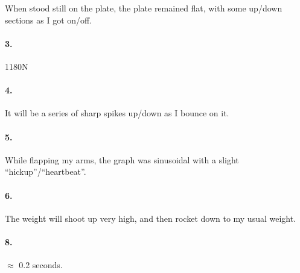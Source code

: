         \begin{mdframed}
            When stood still on the plate, the plate remained flat, with some up/down sections as I got on/off.
        \end{mdframed}

        \paragraph*{3.}

        \begin{mdframed}
            1180N
        \end{mdframed}

        \horizontal

        \paragraph*{4.}

        \begin{mdframed}
            It will be a series of sharp spikes up/down as I bounce on it.
        \end{mdframed}

        \paragraph*{5.}

        \begin{mdframed}
            While flapping my arms, the graph was sinusoidal with a slight ``hickup''/``heartbeat''.
        \end{mdframed}

        \paragraph*{6.}

        \begin{mdframed}
            The weight will shoot up very high, and then rocket down to my usual weight.
        \end{mdframed}

        \paragraph*{8.}

        \begin{mdframed}
            $\approx$ 0.2 seconds.
        \end{mdframed}

